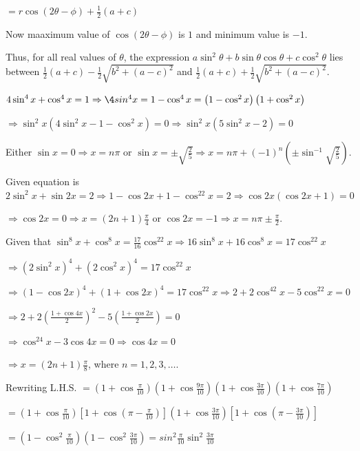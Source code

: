   $= r\cos(2\theta - \phi) + \frac{1}{2}(a + c)$

  Now maaximum value of $\cos(2\theta - \phi)$ is $1$ and minimum value is $-1$.

  Thus, for all real values of $\theta$, the expression $a\sin^2\theta + b\sin\theta\cos\theta +
  c\cos^2\theta$ lies between $\frac{1}{2}(a + c) - \frac{1}{2}\sqrt{b^2 + (a - c)^2}$ and $\frac{1}{2}(a +
  c) + \frac{1}{2}\sqrt{b^2 + (a - c)^2}$.
\item $4\sin^4x + \cos^4x = 1 \Rightarrow \4sin^4x = 1 - \cos^4x = \left(1 - \cos^2x\right)\left(1 + \cos^2x\right)$

  $\Rightarrow \sin^2x\left(4\sin^2x - 1 - \cos^2x\right) = 0 \Rightarrow \sin^2x\left(5\sin^2x - 2\right) =
  0$

  Either $\sin x = 0 \Rightarrow x = n\pi$ or $\sin x = \pm\sqrt{\frac{2}{5}}\Rightarrow x = n\pi +
  (-1)^n\left(\pm\sin^{-1}\sqrt{\frac{2}{5}}\right)$.
\item Given equation is $2\sin^2x + \sin 2x = 2\Rightarrow 1 - \cos2x + 1 - \cos^22x =
  2 \Rightarrow \cos2x(\cos2x + 1) = 0$

  $\Rightarrow \cos2x = 0 \Rightarrow x = (2n + 1)\frac{\pi}{4}$ or $\cos2x = -1 \Rightarrow x =
  n\pi\pm\frac{\pi}{2}$.
\item Given that $\sin^8x + \cos^8x = \frac{17}{16}\cos^22x \Rightarrow 16\sin^8x + 16\cos^8x = 17\cos^22x$

  $\Rightarrow \left(2\sin^2x\right)^4 + \left(2\cos^2x\right)^4 = 17\cos^22x$

  $\Rightarrow (1 - \cos2x)^4 + (1 + \cos2x)^4 = 17\cos^22x\Rightarrow 2 + 2\cos^42x - 5\cos^22x = 0$

  $\Rightarrow 2 + 2\left(\frac{1 + \cos4x}{2}\right)^2 - 5\left(\frac{1 + \cos2x}{2}\right) = 0$

  $\Rightarrow \cos^24x - 3\cos4x = 0 \Rightarrow \cos4x = 0$

  $\Rightarrow x = (2n + 1)\frac{\pi}{8}$, where $n = 1, 2, 3, \ldots$.
\item Rewriting L.H.S. $= \left(1 + \cos\frac{\pi}{10}\right)\left(1 + \cos\frac{9\pi}{10}\right)\left(1
  + \cos\frac{3\pi}{10}\right)\left(1 + \cos\frac{7\pi}{10}\right)$

  $= \left(1 + \cos\frac{\pi}{10}\right)\left[1 + \cos\left(\pi - \frac{\pi}{10}\right)\right]\left(1
  + \cos\frac{3\pi}{10}\right)\left[1 + \cos\left(\pi - \frac{3\pi}{10}\right)\right]$

  $= \left(1 - \cos^2\frac{\pi}{10}\right)\left(1 - \cos^2\frac{3\pi}{10}\right) =
  sin^2\frac{\pi}{10}\sin^2\frac{3\pi}{10}$

